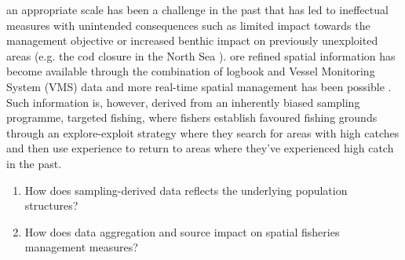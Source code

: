 \documentclass[review]{elsarticle}
\begin{document}
 an
appropriate scale has been a challenge in the past that has led to ineffectual
measures with unintended consequences such as limited impact towards the
management objective or increased benthic impact on previously unexploited
areas (e.g. the cod closure in the North Sea
\citep{Rijnsdorp2001,Dinmore2003}). ore
refined spatial information has  become available through
the combination of logbook and Vessel Monitoring System (VMS) data
\citep{Lee2010, Bastardie2010, Gerritsen2012, Mateo2016} and more real-time
spatial management has been possible \citep[e.g.][]{Holmes2011}.  Such
information is, however, derived from an inherently biased sampling programme,
targeted fishing, where fishers establish favoured fishing grounds through an
explore-exploit strategy \citep{Bailey2018} where they search for areas with
high catches and then use experience to return to areas where they've
experienced high catch in the past.  \\ 


\begin{enumerate}
	\item How does sampling-derived data reflects the underlying population
		structures? 	
	\item How does data aggregation and source impact on spatial fisheries
	management measures?
\end{enumerate}
	
\end{document}
